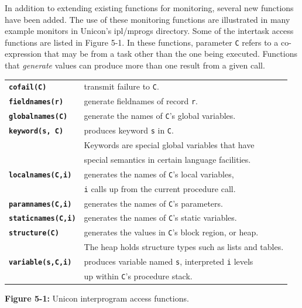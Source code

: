 In addition to extending existing functions for monitoring,
several new functions have been added.  The use of these monitoring functions
are illustrated in many example monitors in Unicon's
ipl/mprogs directory.  Some of the intertask access functions
are listed in Figure 5-1.  In these functions, parameter {\tt C}
refers to a co-expression that may be from a task other than the one being
executed.  Functions that {\em generate\/}
values can produce more than one result from a given call.

\begin{center}

\begin{tabular}{|ll|} \hline
{\bf\tt cofail(C)}      & transmit failure to {\tt C}. \\
{\bf\tt fieldnames(r)}  & generate fieldnames of record {\tt r}. \\
{\bf\tt globalnames(C)} & generate the names of {\tt C}'s global
variables. \\
{\bf\tt keyword(s, C)} & produces keyword {\tt s} in {\tt C}. \\
	& Keywords are special global variables that have \\
	& special semantics in certain language facilities.\\
{\bf\tt localnames(C,i)} & generates the names of {\tt C}'s local variables,\\
	& {\tt i} calls up from the current procedure call. \\
{\bf\tt paramnames(C,i)} & generates the names of {\tt C}'s parameters. \\
{\bf\tt staticnames(C,i)} & generates the names of {\tt C}'s static variables. \\
{\bf\tt structure(C)} & generates the values in {\tt C}'s block
region, or heap. \\
	 & The heap holds structure types such as lists and tables. \\
{\bf\tt variable(s,C,i)} & produces variable named {\tt s}, interpreted {\tt i} levels\\
	& up within {\tt C}'s procedure stack. \\
\hline
\end{tabular}
\end{center}

{\sffamily\bfseries Figure 5-1:}
{\sffamily Unicon interprogram access functions.}



